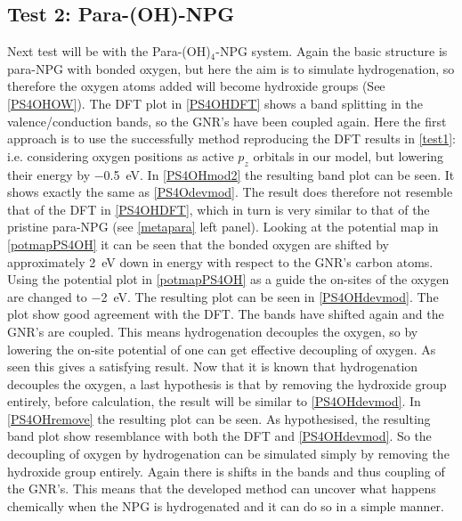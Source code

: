 \subsection{Test 2: Para-(OH)-NPG}\label{test2}
Next test will be with the Para-(OH)\(_4\)-NPG system. Again the basic structure is para-NPG with bonded oxygen, but here the aim is to simulate hydrogenation, so therefore the oxygen atoms added will become hydroxide groups (See \cref{PS4OHOW}). The DFT plot in \cref{PS4OHDFT} shows a band splitting in the valence/conduction bands, so the GNR's have been coupled again. Here the first approach is to use the successfully method reproducing the DFT results in \cref{test1}: i.e. considering oxygen positions as active \(p_z\) orbitals in our model, but lowering their energy by \SI{-0.5}{\electronvolt}. In \cref{PS4OHmod2} the resulting band plot can be seen. It shows exactly the same as \cref{PS4Odevmod}. The result does therefore not resemble that of the DFT in \cref{PS4OHDFT}, which in turn is very similar to that of the pristine para-NPG (see \cref{metapara} left panel). Looking at the potential map in \cref{potmapPS4OH} it can be seen that the bonded oxygen are shifted by approximately \SI{2}{\electronvolt} down in energy with respect to the GNR's carbon atoms. Using the potential plot in \cref{potmapPS4OH} as a guide the on-sites of the oxygen are changed to \SI{-2}{\electronvolt}. The resulting plot can be seen in \cref{PS4OHdevmod}. The plot show good agreement with the DFT. The bands have shifted again and the GNR's are coupled. This means hydrogenation decouples the oxygen, so by lowering the on-site potential of one can get effective decoupling of oxygen. As seen this gives a satisfying result. Now that it is known that hydrogenation decouples the oxygen, a last hypothesis is that by removing the hydroxide group entirely, before calculation, the result will be similar to \cref{PS4OHdevmod}. In \cref{PS4OHremove} the resulting plot can be seen. As hypothesised, the resulting band plot show resemblance with both the DFT and \cref{PS4OHdevmod}. So the decoupling of oxygen by hydrogenation can be simulated simply by removing the hydroxide group entirely. Again there is shifts in the bands and thus coupling of the GNR's. This means that the developed method can uncover what happens chemically when the NPG is hydrogenated and it can do so in a simple manner.
